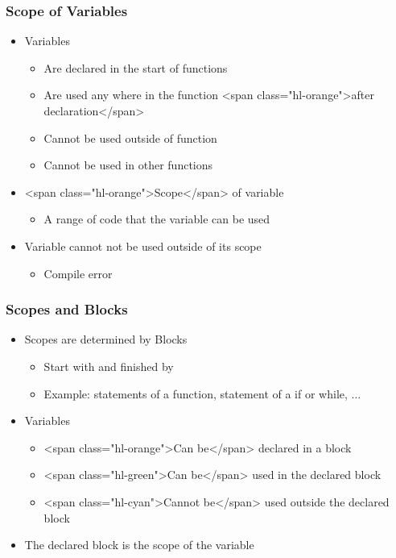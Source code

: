 \documentclass{../c-lecture}
\begin{document}
\begin{frame}
  \frametitle{Scope of Variables}
  \begin{itemize}
    \item Variables
    \begin{itemize}
      \item Are declared in the start of functions
      \item
        Are used any where in the function
        <span class="hl-orange">after declaration</span>

      \item Cannot be used outside of function
      \item Cannot be used in other functions
    \end{itemize}
    \item <span class="hl-orange">Scope</span> of variable
    \begin{itemize}
      \item A range of code that the variable can be used
    \end{itemize}
    \item Variable cannot not be used outside of its scope
    \begin{itemize}
      \item Compile error
    \end{itemize}
  \end{itemize}
\end{frame}
\begin{frame}
  \frametitle{Scopes and Blocks}
  \begin{itemize}
    \item Scopes are determined by Blocks
    \begin{itemize}
      \item Start with { and finished by }
      \item
        Example: statements of a function, statement of a if or while, ...

    \end{itemize}
    \item Variables
    \begin{itemize}
      \item <span class="hl-orange">Can be</span> declared in a block
      \item <span class="hl-green">Can be</span> used in the declared block
      \item
        <span class="hl-cyan">Cannot be</span> used outside the declared block

    \end{itemize}
    \item The declared block is the scope of the variable
  \end{itemize}
\end{frame}
\end{document}
